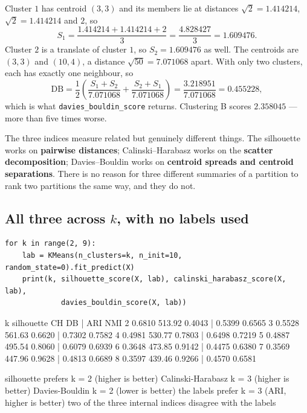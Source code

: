 \documentclass[11pt]{article}
\begin{document}
\begin{worked}
Cluster $1$ has centroid $(3,3)$ and its members lie at distances
$\sqrt{2} = 1.414214$, $\sqrt{2} = 1.414214$ and $2$, so
\[
  S_1 = \frac{1.414214 + 1.414214 + 2}{3} = \frac{4.828427}{3} = 1.609476 .
\]
Cluster $2$ is a translate of cluster $1$, so $S_2 = 1.609476$ as well. The
centroids are $(3,3)$ and $(10,4)$, a distance $\sqrt{50} = 7.071068$ apart.
With only two clusters, each has exactly one neighbour, so
\[
  \mathrm{DB} = \frac{1}{2}\left(\frac{S_1 + S_2}{7.071068}
              + \frac{S_2 + S_1}{7.071068}\right)
              = \frac{3.218951}{7.071068} = \mathbf{0.455228},
\]
which is what \texttt{davies\_bouldin\_score} returns. Clustering B scores
$2.358045$ --- more than five times worse.
\end{worked}

The three indices measure related but genuinely different things. The
silhouette works on \textbf{pairwise distances}; Calinski--Harabasz works on
the \textbf{scatter decomposition}; Davies--Bouldin works on
\textbf{centroid spreads and centroid separations}. There is no reason for
three different summaries of a partition to rank two partitions the same way,
and they do not.

\subsection{All three across $k$, with no labels used}
\label{sec:allthree}

\begin{lstlisting}
for k in range(2, 9):
    lab = KMeans(n_clusters=k, n_init=10, random_state=0).fit_predict(X)
    print(k, silhouette_score(X, lab), calinski_harabasz_score(X, lab),
             davies_bouldin_score(X, lab))
\end{lstlisting}
\begin{codeout}
  k   silhouette           CH           DB |        ARI        NMI
  2       0.6810       513.92       0.4043 |     0.5399     0.6565
  3       0.5528       561.63       0.6620 |     0.7302     0.7582
  4       0.4981       530.77       0.7803 |     0.6498     0.7219
  5       0.4887       495.54       0.8060 |     0.6079     0.6939
  6       0.3648       473.85       0.9142 |     0.4475     0.6380
  7       0.3569       447.96       0.9628 |     0.4813     0.6689
  8       0.3597       439.46       0.9266 |     0.4570     0.6581
\end{codeout}
\begin{codeout}
silhouette prefers k = 2  (higher is better)
Calinski-Harabasz  k = 3  (higher is better)
Davies-Bouldin     k = 2  (lower  is better)
the labels prefer  k = 3  (ARI, higher is better)
two of the three internal indices disagree with the labels
\end{codeout}
\end{document}
